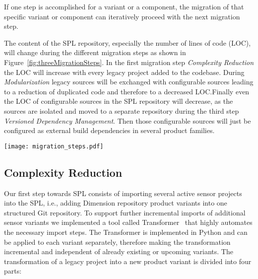 If one step is accomplished for a variant or a component, the migration of that
specific variant or component can iteratively proceed with the next migration
step.

The content of the SPL repository, especially the number of lines of code (LOC),
will change during the different migration steps as shown in
Figure~\ref{fig:threeMigrationSteps}. In the first migration step
\textit{Complexity Reduction} the LOC will increase with every legacy project
added to the codebase. During \textit{Modularization} legacy sources will be
exchanged with configurable sources leading to a reduction of duplicated code
and therefore to a decreased LOC.\@ Finally even the LOC of configurable sources
in the SPL repository will decrease, as the sources are isolated and moved to a
separate repository during the third step \textit{Versioned Dependency
Management}. Then those configurable sources will just be configured as external
build dependencies in several product families.

\begin{figure*}[ht]
  \centering
  \texttt{[image: migration\_steps.pdf]}
  \caption{Three Migration Steps to SPL}
  \label{fig:threeMigrationSteps}
\end{figure*}

\subsection{Complexity Reduction}\label{complexity}

Our first step towards SPL consists of importing several active sensor projects
into the SPL, i.e., adding Dimension repository product variants into one
structured Git repository. To support further incremental imports of additional
sensor variants we implemented a tool called
Transformer~\cite{GithubTransformer} that highly automates the necessary import
steps. The Transformer is implemented in Python and can be applied to each
variant separately, therefore making the transformation incremental and
independent of already existing or upcoming variants. The transformation of a
legacy project into a new product variant is divided into four parts:

